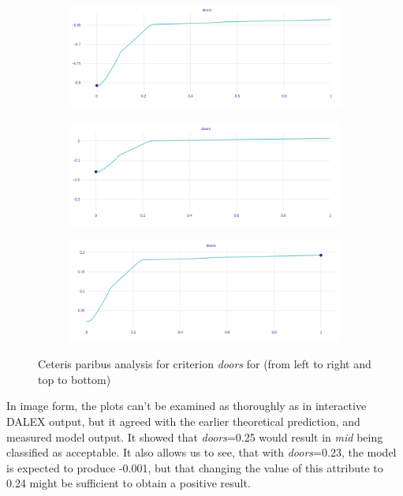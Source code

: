 \documentclass[../main.tex]{subfiles}
\begin{document}
\begin{figure}[H]
    \centering
    \begin{subfigure}[b]{0.4\linewidth}
        \makeatletter{}\makeatother
        \includegraphics[width=\linewidth]{../img/doors_worst.png}
        \label{fig:UTA-ceteris-paribus-doors}
    \end{subfigure}
    \begin{subfigure}[b]{0.4\linewidth}
        \includegraphics[width=\linewidth]{../img/doors_medium.png}
    \end{subfigure}

    \begin{subfigure}[b]{0.4\linewidth}
        \includegraphics[width=\linewidth]{../img/doors_best.png}
    \end{subfigure}
    \caption{Ceteris paribus analysis for criterion \emph{doors} for (from left to right and
    top to bottom)}
\end{figure}

In image form, the plots can't be examined as thoroughly as in interactive DALEX output, but it agreed
with the earlier theoretical prediction, and measured model output. It showed that \emph{doors}=0.25 would result
in \emph{mid} being classified as acceptable. It also allows us to see, that with \emph{doors}=0.23, the
model is expected to produce -0.001, but that changing the value of this attribute to 0.24 might be sufficient to
obtain a positive result.
\end{document}
